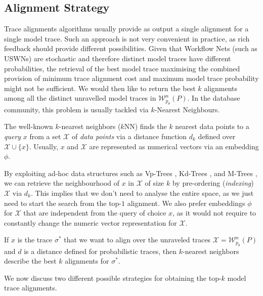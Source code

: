 
\subsection{Alignment Strategy}
Trace alignments algorithms usually provide as output a single alignment for a single model trace. Such an approach is not very convenient in practice, as rich feedback should provide different possibilities. Given that Workflow Nets (such as USWNs) are stochastic and therefore distinct model traces have different probabilities, the retrieval of the best model trace maximising the combined provision of minimum trace alignment cost and maximum model trace probability might not be sufficient. We would then like to return the best $k$ alignments among all the distinct unravelled model traces in $\mathcal{W}^n_{p_\theta}(P)$. In the database community, this problem is usually tackled via $k$-Nearest Neighbours.

The well-known $k$-nearest neighbors ($k$NN) \cite{Altman} finds the $k$ nearest data points to a \textit{query} $x$ from a set $\mathcal{X}$ of \textit{data points} via a distance function $d_k$ defined over $\mathcal{X}\cup\{x\}$. Usually, $x$ and $\mathcal{X}$ are represented as numerical vectors via an embedding $\phi$. {By exploiting ad-hoc data structures such as Vp-Trees \cite{Fu2000}, Kd-Trees \cite{Maneewongvatana99}, and M-Trees \cite{Ciaccia}, we can retrieve the neighbourhood of $x$ in $\mathcal{X}$ of size $k$  by pre-ordering (\textit{indexing}) $\mathcal{X}$  via $d_k$. This implies that we don't need to analyse the entire space, as we just need to start the search from the top-$1$ alignment. We also prefer embeddings $\phi$ for $\mathcal{X}$ that are independent from the query of choice $x$, as it would not require to constantly change the numeric vector representation for $\mathcal{X}$.
	
If $x$ is the trace $\sigma^*$ that we want to align over the unraveled traces $\mathcal{X}=\mathcal{W}^n_{p_\theta}(P)$ and $d$ is a distance defined for probabilistic traces, then $k$-nearest neighbors describe the best $k$ alignments for $\sigma^*$.} We now discuss two different possible strategies for obtaining the top-$k$ model trace alignments.

